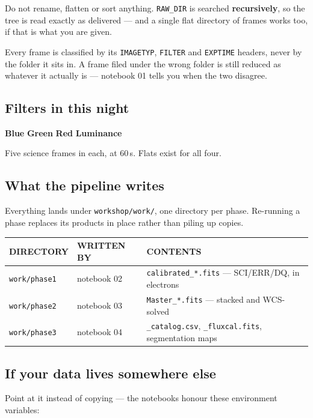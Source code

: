 \documentclass[11pt,a4paper]{article}
\newcommand{\cm}[1]{\texttt{\small #1}}
\newcommand{\thead}[1]{{\sffamily\bfseries\scriptsize\color{inkfaint}\MakeUppercase{#1}}}
\begin{document}
Do not rename, flatten or sort anything. \cm{RAW\_DIR} is searched \textbf{recursively}, so the
tree is read exactly as delivered --- and a single flat directory of frames works too, if that
is what you are given.

\begin{note}
Every frame is classified by its \cm{IMAGETYP}, \cm{FILTER} and \cm{EXPTIME} headers, never by
the folder it sits in. A frame filed under the wrong folder is still reduced as whatever it
actually is --- notebook 01 tells you when the two disagree.
\end{note}

\subsection{Filters in this night}
\textcolor[HTML]{3E6FB8}{\sffamily\bfseries\small Blue}\quad
\textcolor[HTML]{3F8A55}{\sffamily\bfseries\small Green}\quad
\textcolor[HTML]{B4483A}{\sffamily\bfseries\small Red}\quad
\textcolor[HTML]{6C7885}{\sffamily\bfseries\small Luminance}\par
\vspace{4pt}
Five science frames in each, at 60\,s. Flats exist for all four.

\subsection{What the pipeline writes}
Everything lands under \cm{workshop/work/}, one directory per phase. Re-running a phase
replaces its products in place rather than piling up copies.

\vspace{4pt}
\begin{tabularx}{\textwidth}{@{}p{2.9cm}p{2.5cm}X@{}}
\toprule
\thead{Directory} & \thead{Written by} & \thead{Contents} \\
\midrule
\cm{work/phase1} & notebook 02 & \cm{calibrated\_*.fits} --- SCI/ERR/DQ, in electrons \\
\cm{work/phase2} & notebook 03 & \cm{Master\_*.fits} --- stacked and WCS-solved \\
\cm{work/phase3} & notebook 04 & \cm{*\_catalog.csv}, \cm{*\_fluxcal.fits}, segmentation maps \\
\bottomrule
\end{tabularx}

\subsection{If your data lives somewhere else}
Point at it instead of copying --- the notebooks honour these environment variables:
\end{document}

